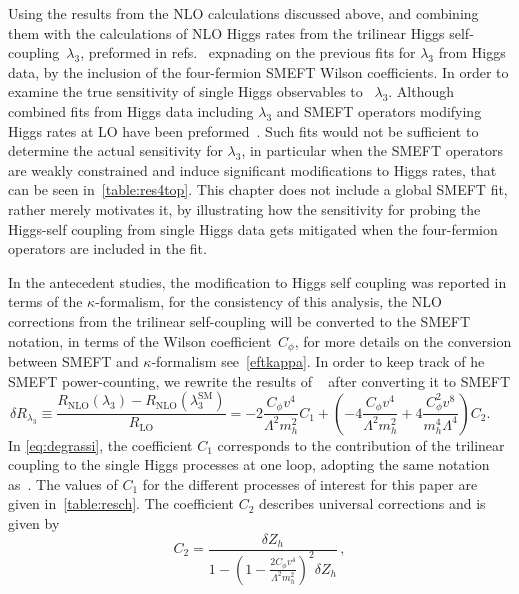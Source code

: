 \par Using the results from the  NLO calculations discussed above, and combining them with the calculations of NLO Higgs rates from the trilinear Higgs self-coupling~$\lambda_3$, preformed in refs.~\cite{Gorbahn:2016uoy, Degrassi:2016wml, Bizon:2016wgr, Maltoni:2017ims, Degrassi:2021uik}  expnading  on the previous fits for $\lambda_3$ from Higgs data, by the inclusion of the four-fermion SMEFT Wilson coefficients. In order to examine the true sensitivity of single Higgs observables to ~$\lambda_3$.  
Although combined fits from Higgs data including $\lambda_3$ and SMEFT operators modifying Higgs rates at LO have been preformed~\cite{DiVita:2017eyz}. Such fits would not be sufficient to determine the actual sensitivity for $\lambda_3$, in particular when the SMEFT operators are weakly constrained and induce significant modifications to Higgs rates, that can be seen in~\autoref{table:res4top}. This chapter does not include a global SMEFT fit, rather merely motivates it, by illustrating how the sensitivity for probing the Higgs-self coupling from single Higgs data gets mitigated when the four-fermion operators are included in the fit.
%
\par In the antecedent studies, the modification to Higgs self coupling was reported in terms of the $\kappa$-formalism, for the consistency of this analysis, the NLO corrections from the trilinear self-coupling will be converted to the SMEFT notation, in terms of the Wilson coefficient~$C_\phi$, for more details on the conversion between SMEFT and $\kappa$-formalism see~\autoref{eftkappa}. In order to keep track of he SMEFT power-counting,  we rewrite the results of ~\cite{Degrassi:2016wml} after converting it to SMEFT 
\begin{equation}
	\delta R_{\lambda_3}\equiv\frac{R_\mathrm{ NLO}(\lambda_3)-R_\mathrm{ NLO}(\lambda_3^\mathrm{{SM}})}{R_\mathrm{ LO}}=-2\frac{C_{\phi}v^4}{\Lambda^2 m_h^2}C_1 + \left(-4\frac{C_{\phi}v^4}{\Lambda^2 m_h^2}+4\frac{C_{\phi}^2 v^8}{m_h^4\Lambda^4}\right) C_2 . \;\;\;\;\;
	\label{eq:degrassi}
\end{equation}
%
In \eqref{eq:degrassi}, the coefficient $C_1$ corresponds to the contribution of the trilinear coupling to the single Higgs processes at one loop, adopting the same notation as~\cite{Degrassi:2016wml}. The values of $C_1$ for the different processes of interest for this paper are given in~\autoref{table:resch}. The coefficient $C_2$ describes universal corrections and is given by
\begin{equation}
	C_2=\frac{\delta Z_h}{1-\left(1-\frac{2 C_\phi v^4}{\Lambda^2 m_h^2}\right)^2 \delta Z_h}\,, \label{eq:C2}
\end{equation}
